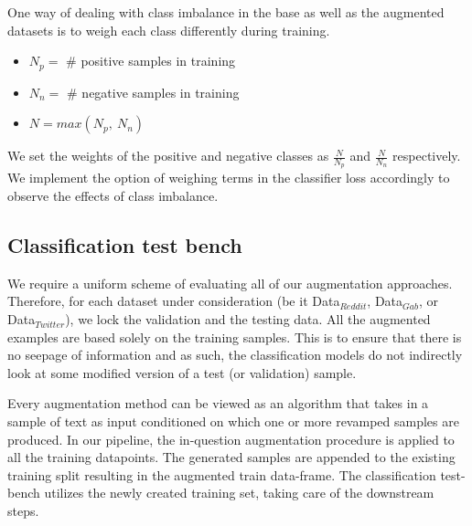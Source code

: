 \documentclass[11pt,a4paper]{article}
\begin{document}
One way of dealing with class imbalance in the base as well as the augmented datasets is to weigh each class differently during training.

\begin{itemize}
    \itemsep-0.3em
    \item $N_p = $ \# positive samples in training
    \item $N_n = $ \# negative samples in training
    \item $N = max(N_p,\ N_n)$
\end{itemize}

We set the weights of the positive and negative classes as $\frac{N}{N_p}$ and $\frac{N}{N_n}$ respectively. We implement the option of weighing terms in the classifier loss accordingly to observe the effects of class imbalance.


\subsection{Classification test bench}

We require a uniform scheme of evaluating all of our augmentation approaches. Therefore, for each dataset under consideration (be it Data$_{Reddit}$, Data$_{Gab}$, or Data$_{Twitter}$), we lock the validation and the testing data. All the augmented examples are based solely on the training samples. This is to ensure that there is no seepage of information and as such, the classification models do not indirectly look at some modified version of a test (or validation) sample.

Every augmentation method can be viewed as an algorithm that takes in a sample of text as input conditioned on which one or more revamped samples are produced. In our pipeline, the in-question augmentation procedure is applied to all the training datapoints. The generated samples are appended to the existing training split resulting in the augmented train data-frame. The classification test-bench utilizes the newly created training set, taking care of the downstream steps. 
\end{document}
